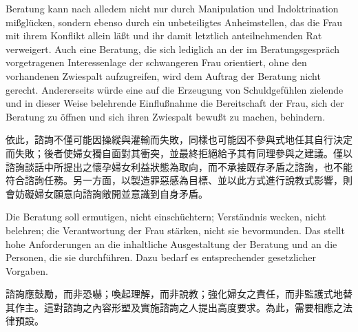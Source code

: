 \documentclass[12pt]{article}
\begin{document}
\begin{sourcepara}[title={原文D.111}]
Beratung kann nach alledem nicht nur durch Manipulation und Indoktrination mißglücken, sondern ebenso durch ein unbeteiligtes Anheimstellen, das die Frau mit ihrem Konflikt allein läßt und ihr damit letztlich anteilnehmenden Rat verweigert. Auch eine Beratung, die sich lediglich an der im Beratungsgespräch vorgetragenen Interessenlage der schwangeren Frau orientiert, ohne den vorhandenen Zwiespalt aufzugreifen, wird dem Auftrag der Beratung nicht gerecht. Andererseits würde eine auf die Erzeugung von Schuldgefühlen zielende und in dieser Weise belehrende Einflußnahme die Bereitschaft der Frau, sich der Beratung zu öffnen und sich ihren Zwiespalt bewußt zu machen, behindern.
\end{sourcepara}
\begin{transpara}
依此，諮詢不僅可能因操縱與灌輸而失敗，同樣也可能因不參與式地任其自行決定而失敗；後者使婦女獨自面對其衝突，並最終拒絕給予其有同理參與之建議。僅以諮詢談話中所提出之懷孕婦女利益狀態為取向，而不承接既存矛盾之諮詢，也不能符合諮詢任務。另一方面，以製造罪惡感為目標、並以此方式進行說教式影響，則會妨礙婦女願意向諮詢敞開並意識到自身矛盾。
\end{transpara}

\begin{sourcepara}[title={原文D.112}]
Die Beratung soll ermutigen, nicht einschüchtern; Verständnis wecken, nicht belehren; die Verantwortung der Frau stärken, nicht sie bevormunden. Das stellt hohe Anforderungen an die inhaltliche Ausgestaltung der Beratung und an die Personen, die sie durchführen. Dazu bedarf es entsprechender gesetzlicher Vorgaben.
\end{sourcepara}
\begin{transpara}
諮詢應鼓勵，而非恐嚇；喚起理解，而非說教；強化婦女之責任，而非監護式地替其作主。這對諮詢之內容形塑及實施諮詢之人提出高度要求。為此，需要相應之法律預設。
\end{transpara}
\end{document}
